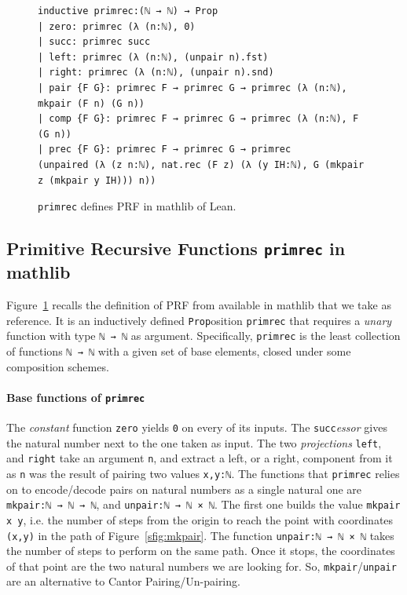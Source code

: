 \documentclass[preprint]{elsarticle}
\theoremstyle{remark}
\newcommand{\PRF}{\textsf{PRF}\xspace}
\newcommand{\MATHLIB}{\textsf{mathlib}\xspace}
\newcommand{\LEAN}{\textsf{Lean}\xspace}
\begin{document}
\begin{figure}
\begin{lstlisting}[basicstyle=\small]
inductive primrec:(ℕ → ℕ) → Prop
| zero: primrec (λ (n:ℕ), 0)
| succ: primrec succ
| left: primrec (λ (n:ℕ), (unpair n).fst)
| right: primrec (λ (n:ℕ), (unpair n).snd)
| pair {F G}: primrec F → primrec G → primrec (λ (n:ℕ), mkpair (F n) (G n))
| comp {F G}: primrec F → primrec G → primrec (λ (n:ℕ), F (G n))
| prec {F G}: primrec F → primrec G → primrec
(unpaired (λ (z n:ℕ), nat.rec (F z) (λ (y IH:ℕ), G (mkpair z (mkpair y IH))) n))
\end{lstlisting}
\caption{\lstinline|primrec| defines \PRF in \MATHLIB of \LEAN.}
\label{fig: primrec}
\end{figure}


\subsection{Primitive Recursive Functions \texttt{primrec} in \MATHLIB }
\label{section:Unary Primitive Recursive Functions}

Figure~\ref{fig: primrec} recalls the definition of \PRF from \cite{Carneiro-primrecMathlib} available in \MATHLIB that we take as reference. It is an inductively defined \lstinline|Prop|osition \lstinline|primrec| that requires a \emph{unary} function with type \lstinline|ℕ → ℕ| as argument. Specifically, \lstinline|primrec| is the least collection of functions \lstinline|ℕ → ℕ| with a given set of base elements, closed under some composition schemes.

\paragraph{Base functions of {\normalfont \texttt{primrec}}}
The \emph{constant} function \lstinline|zero| yields \lstinline|0| on every of its inputs.
The \lstinline|succ|\emph{essor} gives the natural number next to the one taken as input.
The two \emph{projections} \lstinline|left|, and \lstinline|right| take an argument \lstinline|n|, and extract a left, or a right, component from it as \lstinline|n| was the result of pairing two values \lstinline|x,y:ℕ|. The functions that \lstinline|primrec| relies on to encode/decode pairs on natural numbers as a single natural one are \lstinline|mkpair:ℕ → ℕ → ℕ|, and \lstinline|unpair:ℕ → ℕ × ℕ|. The first one builds the value \lstinline|mkpair x y|, i.e. the number of steps from the origin to reach the point with coordinates \lstinline|(x,y)| in the path of Figure~\ref{sfig:mkpair}. The function \lstinline|unpair:ℕ → ℕ × ℕ| takes the number of steps to perform on the same path. Once it stops, the coordinates of that point are the two natural numbers we are looking for. So, \lstinline|mkpair|/\lstinline|unpair| are an alternative to Cantor Pairing/Un-pairing.
\end{document}
